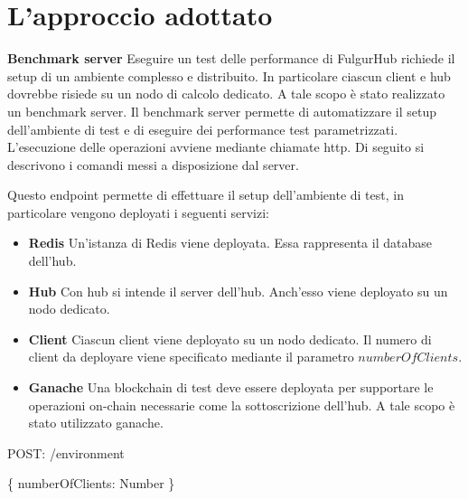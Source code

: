 \documentclass[12pt,italian,]{book}
\newenvironment{Shaded}{}{}
\newcommand{\DataTypeTok}[1]{\textcolor[rgb]{0.56,0.13,0.00}{#1}}
\newcommand{\NormalTok}[1]{#1}
\newcommand{\OperatorTok}[1]{\textcolor[rgb]{0.40,0.40,0.40}{#1}}
\newcommand{\SpecialStringTok}[1]{\textcolor[rgb]{0.73,0.40,0.53}{#1}}
\providecommand{\tightlist}{%
  \setlength{\itemsep}{0pt}\setlength{\parskip}{0pt}}
\begin{document}
\hypertarget{lapproccio-adottato}{%
\section{L'approccio adottato}\label{lapproccio-adottato}}

\textbf{\textbf{Benchmark server}} Eseguire un test delle performance di FulgurHub richiede il setup di un ambiente complesso e distribuito. In particolare ciascun client e hub dovrebbe risiede su un nodo di calcolo dedicato. A tale scopo è stato realizzato un benchmark server. Il benchmark server permette di automatizzare il setup dell'ambiente di test e di eseguire dei performance test parametrizzati. L'esecuzione delle operazioni avviene mediante chiamate http. Di seguito si descrivono i comandi messi a disposizione dal server.

Questo endpoint permette di effettuare il setup dell'ambiente di test, in particolare vengono deployati i seguenti servizi:

\begin{itemize}
\tightlist
\item
  \textbf{\textbf{Redis}} Un'istanza di Redis viene deployata. Essa rappresenta il database dell'hub.
\item
  \textbf{\textbf{Hub}} Con hub si intende il server dell'hub. Anch'esso viene deployato su un nodo dedicato.
\item
  \textbf{\textbf{Client}} Ciascun client viene deployato su un nodo dedicato. Il numero di client da deployare viene specificato mediante il parametro \(numberOfClients\).
\item
  \textbf{\textbf{Ganache}} Una blockchain di test deve essere deployata per supportare le operazioni on-chain necessarie come la sottoscrizione dell'hub. A tale scopo è stato utilizzato ganache.
\end{itemize}

\begin{Shaded}
\begin{Highlighting}[]
\NormalTok{POST}\OperatorTok{:} \SpecialStringTok{/environment}
\end{Highlighting}
\end{Shaded}

\begin{Shaded}
\begin{Highlighting}[]
\OperatorTok{\{}
    \DataTypeTok{numberOfClients}\OperatorTok{:}\NormalTok{ Number}
\OperatorTok{\}}
\end{Highlighting}
\end{Shaded}
\end{document}
